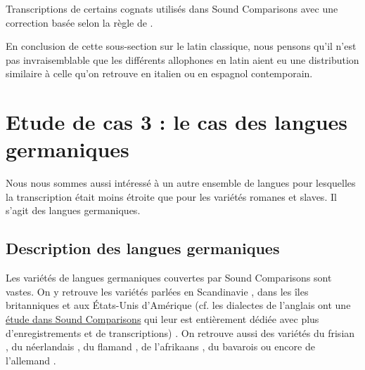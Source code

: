 \begin{table}
	\centering
	\caption[Transcriptions de certains cognats utilisés dans Sound Comparison avec une correction basée selon la règle de Canepari (2008)]{Transcriptions de certains cognats utilisés dans Sound Comparisons avec une correction basée selon la règle de \textcite{canepariPronunciaNeutraInternazionale2008}.}
	\label{tab:productionclassicallatin}
\end{table}

En conclusion de cette sous-section sur le latin classique, nous pensons qu'il n'est pas invraisemblable que les différents allophones en latin aient eu une distribution similaire à celle qu'on retrouve en italien ou en espagnol contemporain.


\section{Etude de cas 3 : le cas des langues germaniques}

Nous nous sommes aussi intéressé à un autre ensemble de langues pour lesquelles la transcription était moins étroite que pour les variétés romanes et slaves. Il s'agit des langues germaniques.

\subsection{Description des langues germaniques}

Les variétés de langues germaniques couvertes par Sound Comparisons sont vastes. On y retrouve les variétés parlées en Scandinavie \parencites{engstrandSwedish1990,gronnumDanish1998,basbollPhonologyDanish2005,kristjanarnasonPhonologyIcelandicFaroese2011}, dans les îles britanniques et aux États-Unis d'Amérique (cf. les dialectes de l'anglais ont une {\href{https://soundcomparisons.com/#/en/Englishes/map/red/Lgs_Sln}{étude dans Sound Comparisons}} qui leur est entièrement dédiée avec plus d'enregistrements et de transcriptions) \parencite{decampAmericanEnglishEastern1973,nallyNotesWestmeathDialect1971,hillenbrandAmericanEnglishSouthern2003,wattTynesideEnglish2003,roachBritishEnglishReceived2004,watsonLiverpoolEnglish2007}. On retrouve aussi des variétés du frisian \parencite{petersSaterlandFrisian2019}, du néerlandais \parencite{meesPhoneticDescriptionConsonant1982,gussenhovenDutch1992,heijmansDutchDialectWeert1998,verhoevenBelgianStandardDutch2005}, du flamand \parencite{petersFlemishBrabantDialectOrsmaalGussenhoven2010}, de l'afrikaans \parencite{wissingAfrikaans2020}, du bavarois \parencite{galataAcousticAnalysisTyrolean2016} ou encore de l'allemand \parencite{kohlerGerman1990,khanUpperSaxonChemnitz2013}.\\

